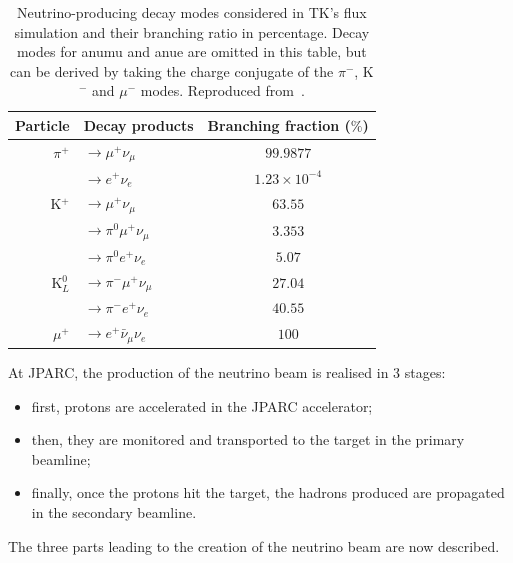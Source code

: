 \begin{table}[ht]
  \begin{center}
    \begin{tabular}{rlc}
      \toprule
      Particle & Decay products & Branching fraction ($\%$) \\
      \midrule
      $\pi^{+}$ & $\rightarrow \mu^{+}\nu_{\mu}$ & $99.9877$ \\
               & $\rightarrow e^{+}\nu_{e}$ &  $1.23\times10^{-4}$\\
      K$^{+}$ &  $\rightarrow \mu^{+}\nu_{\mu}$ & $63.55$ \\
               &  $\rightarrow \pi^{0}\mu^{+}\nu_{\mu}$ & $3.353$ \\
               &  $\rightarrow \pi^{0}e^{+}\nu_{e}$ & $5.07$ \\
      K$_L^{0}$ & $\rightarrow \pi^{-}\mu^{+}\nu_{\mu}$ & $27.04$ \\
               & $\rightarrow \pi^{-}e^{+}\nu_{e}$ & $40.55$ \\
      $\mu^{+}$ & $\rightarrow e^{+}\bar{\nu}_{\mu}\nu_{e}$ & $100$ \\
      \bottomrule
    \end{tabular}
    \caption[Neutrino-producing decay modes considered in T2K's flux
    simulation]{Neutrino-producing decay modes considered in
      \Gls{TK}'s flux simulation and their branching ratio in
      percentage.  Decay modes for \gls{anumu} and \gls{anue} are
      omitted in this table, but can be derived by taking the charge
      conjugate of the $\pi^{-}$, K$^{-}$ and $\mu^{-}$
      modes. Reproduced from~\cite{FluxT2K2013}.}
    \label{tab:nudecaymode}
  \end{center}
\end{table}

At \gls{JPARC}, the production of the neutrino beam is realised in 3
stages:
\begin{itemize}[noitemsep,topsep=0pt]
\item first, protons are accelerated in the \gls{JPARC} accelerator;
\item then, they are monitored and transported to the target in the
  primary beamline;
\item finally, once the protons hit the target, the hadrons produced
  are propagated in the secondary beamline.
\end{itemize}
The three parts leading to the creation of the neutrino beam are now
described.

